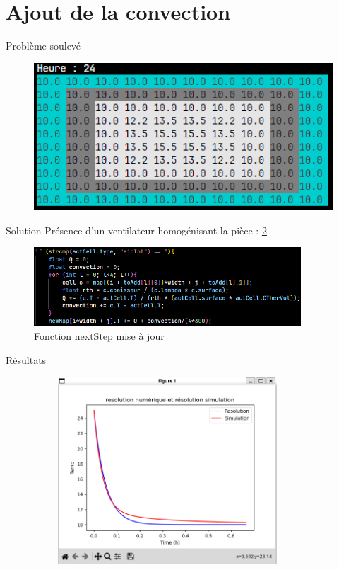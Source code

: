 \documentclass{beamer}
\begin{document}
\section{Ajout de la convection}
\begin{frame}{Problème soulevé}
    \begin{figure}
        \centering
        \includegraphics[width=12cm]{compilation.png}
        \label{fig:compilation}
    \end{figure}
\end{frame}

\begin{frame}{Solution}
    Présence d'un ventilateur homogénisant la pièce : \ref{fig:convection}
    \begin{figure}
        \centering
        \includegraphics[width=10cm]{convection.png}
        \caption{Fonction nextStep mise à jour}
        \label{fig:convection}
    \end{figure}    
\end{frame}

\begin{frame}{Résultats}
    \begin{figure}
        \centering
        \includegraphics[width=10cm, height=7cm]{courbe2.png}
        \label{fig:courbe2}
    \end{figure}
\end{frame}
\end{document}
